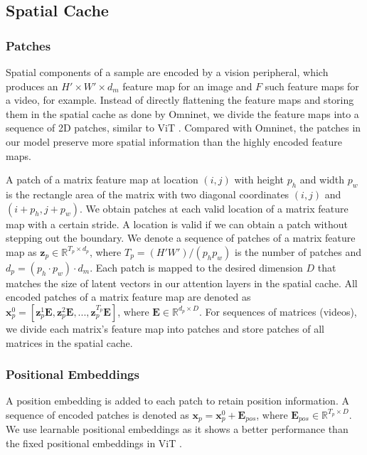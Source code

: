 \documentclass{article}
\begin{document}
\subsection{Spatial Cache}

\subsubsection{Patches}

Spatial components of a sample are encoded by a vision peripheral, which produces an $H' \times W' \times d_m$ feature map for an image and $F$ such feature maps for a video, for example. Instead of directly flattening the feature maps and storing them in the spatial cache as done by Omninet, we divide the feature maps into a sequence of 2D patches, similar to ViT \cite{dosovitskiy2020image}. Compared with Omninet, the patches in our model preserve more spatial information than the highly encoded feature maps. 

A patch of a matrix feature map at location $(i,j)$ with height $p_{h}$ and width $p_{w}$ is the rectangle area of the matrix with two diagonal coordinates $(i,j)$ and $(i+p_{h},j+p_{w})$. We obtain patches at each valid location of a matrix feature map with a certain stride. A location is valid if we can obtain a patch without stepping out the boundary. We denote a sequence of patches of a matrix feature map as $\mathbf{z}_{p} \in \mathbb{R}^{T_p \times d_p}$, where $T_p = (H'W')/(p_{h}p_{w})$ is the number of patches and $d_p = (p_{h} \cdot p_{w}) \cdot d_m$. Each patch is mapped to the desired dimension $D$ that matches the size of latent vectors in our attention layers in the spatial cache. All encoded patches of a matrix feature map are denoted as $\mathbf{x}^{0}_{p} = [\mathbf{z}^{1}_{p} \mathbf{E},\mathbf{z}^2_{p} \mathbf{E}, ..., \mathbf{z}^{T_p}_{p} \mathbf{E}]$, where $\mathbf{E} \in \mathbb{R}^{d_p \times D}$. For sequences of matrices (videos), we divide each matrix's feature map into patches and store patches of all matrices in the spatial cache. %

\subsubsection{Positional Embeddings}
A position embedding is added to each patch to retain position information. A sequence of encoded patches is denoted as $\mathbf{x}_{p} = \mathbf{x}^{0}_{p} + \mathbf{E}_{pos}$, where $\mathbf{E}_{pos} \in \mathbb{R}^{T_p \times D}$. We use learnable positional embeddings as it shows a better performance than the fixed positional embeddings in ViT \cite{dosovitskiy2020image}.  
\end{document}
